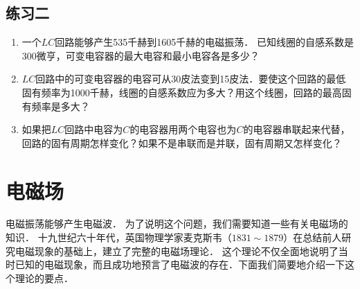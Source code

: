 \subsection*{练习二}
\begin{enumerate}
    \item 一个$LC$回路能够产生535千赫到1605千赫的电磁振荡．
    已知线圈的自感系数是300微亨，可变电容器的最大电容和最小电容各是多少？
    \item $LC$回路中的可变电容器的电容可从30皮法变到15皮法．要使这个回路的最低固有频率为1000千赫，线圈的自感系数应为多大？用这个线圈，回路的最高固有频率是多大？
    \item 如果把$LC$回路中电容为$C$的电容器用两个电容也为$C$的电容器串联起来代替，回路的固有周期怎样变化？如果不是串联而是并联，固有周期又怎样变化？
\end{enumerate}


\section{电磁场}

电磁振荡能够产生电磁波．
为了说明这个问题，我们需要知道一些有关电磁场的知识．
十九世纪六十年代，英国物理学家麦克斯韦（$1831 \sim 1879$）在总结前人研究电磁现象的基础上，建立了完整的电磁场理论．
这个理论不仅全面地说明了当时已知的电磁现象，而且成功地预言了电磁波的存在．下面我们简要地介绍一下这个理论的要点．

